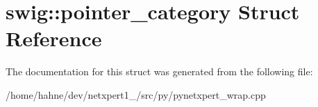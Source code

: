 \hypertarget{structswig_1_1pointer__category}{}\section{swig\+:\+:pointer\+\_\+category Struct Reference}
\label{structswig_1_1pointer__category}


The documentation for this struct was generated from the following file\+:\begin{DoxyCompactItemize}
\item 
/home/hahne/dev/netxpert1\+\_/src/py/pynetxpert\+\_\+wrap.\+cpp\end{DoxyCompactItemize}
